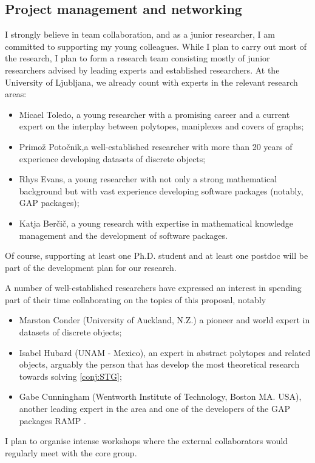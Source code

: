 \documentclass[a4paper,12pt,english]{article}
\begin{document}
\subsection*{Project management and networking}

I strongly believe in team collaboration, and as a junior researcher, I am committed to supporting my young colleagues.
While I plan to carry out most of the research, I plan to form a research team consisting mostly of junior researchers advised by leading experts and established researchers.
At the University of Ljubljana, we already count with experts in the relevant research areas:
\begin{itemize}
    \item Micael Toledo, a young researcher with a promising career and a current expert on the interplay between polytopes, maniplexes and covers of graphs;
    \item Primož Potočnik,a well-established researcher with more than 20 years of experience developing datasets of discrete objects;
    \item Rhys Evans, a young researcher with not only a strong mathematical background but with vast experience developing software packages (notably, GAP packages);
    \item Katja Berčič, a young research with expertise in  mathematical knowledge management and the development of software packages.
\end{itemize}

Of course, supporting at least one Ph.D. student and at least one postdoc will be part of the development plan for our research.

A number of well-established researchers have expressed an interest in spending part of their time collaborating on the topics of this proposal, notably
\begin{itemize}
    \item Marston Conder (University of Auckland, N.Z.) a pioneer and world expert in datasets of discrete objects;
    \item Isabel Hubard (UNAM - Mexico), an expert in abstract polytopes and related objects, arguably the person that has develop the most theoretical research towards solving \cref{conj:STG};
    \item Gabe Cunningham (Wentworth Institute of Technology, Boston MA. USA), another leading expert in the area and one of the developers of the GAP packages RAMP \cite{CunnMixWil2022_RampResearchAssistant}.
\end{itemize}

I plan to organise intense workshops where the external collaborators would regularly meet with the core group.


\printbibliography






 
\end{document}
